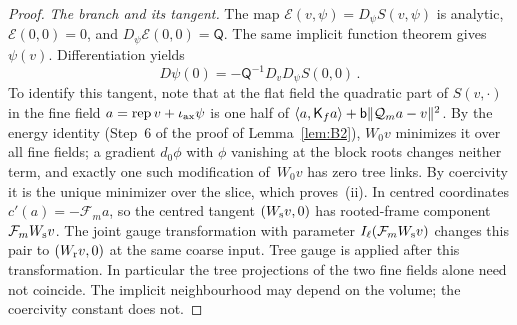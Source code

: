 \begin{proof}
\emph{The branch and its tangent.} The map $\mathcal E(v,\psi)=D_\psi S(v,\psi)$ is analytic, $\mathcal E(0,0)=0$, and $D_\psi\mathcal E(0,0)=\mathsf Q$. The same implicit function theorem gives $\psi(v)$. Differentiation yields
\begin{equation*}
D\psi(0)=-\mathsf Q^{-1}D_vD_\psi S(0,0)\,.
\end{equation*}
To identify this tangent, note that at the flat field the quadratic part of $S(v,\cdot)$ in the fine field $a=\operatorname{rep}v+\iota_{\rm ax}\psi$ is one half of $\langle a,\mathsf K_fa\rangle+\mathsf{b}\|\mathcal Q_ma-v\|^2$. By the energy identity (Step~6 of the proof of Lemma~\ref{lem:B2}), $W_0v$ minimizes it over all fine fields; a gradient $d_0\phi$ with $\phi$ vanishing at the block roots changes neither term, and exactly one such modification of~$W_0v$ has zero tree links. By coercivity it is the unique minimizer over the slice, which proves~(ii). In centred coordinates $c'(a)=-\mathcal F_ma$, so the centred tangent $(W_{\rm s}v,0)$ has rooted-frame component $\mathcal F_mW_{\rm s}v$. The joint gauge transformation with parameter $I_\ell(\mathcal F_mW_{\rm s}v)$ changes this pair to $(W_{\rm r}v,0)$ at the same coarse input. Tree gauge is applied after this transformation. In particular the tree projections of the two fine fields alone need not coincide. The implicit neighbourhood may depend on the volume; the coercivity constant does not.


\end{proof}
